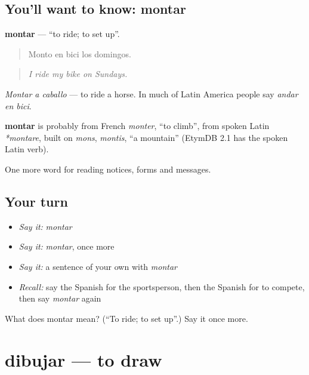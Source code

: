 \subsection*{You'll want to know: montar}
\textbf{montar} — \textquotedblleft{}to ride; to set up\textquotedblright{}.

\begin{quote}
Monto en bici los domingos.
\end{quote}

\begin{quote}
\emph{I ride my bike on Sundays.}
\end{quote}

\emph{Montar a caballo} — to ride a horse. In much of Latin America people say \emph{andar en bici}.

\begin{cousinweb}
\textbf{montar} is probably from French \emph{monter}, \textquotedblleft{}to climb\textquotedblright{}, from spoken Latin \emph{*montare}, built on \emph{mons}, \emph{montis}, \textquotedblleft{}a mountain\textquotedblright{} (EtymDB 2.1 has the spoken Latin verb).
\end{cousinweb}

\begin{grammarlens}[title={What you've built}]
One more word for reading notices, forms and messages.
\end{grammarlens}

\subsection*{Your turn}
\begin{itemize}
\raggedright
  \item \emph{Say it:} \emph{montar}
  \item \emph{Say it:} \emph{montar}, once more
  \item \emph{Say it:} a sentence of your own with \emph{montar}
  \item \emph{Recall:} say the Spanish for the sportsperson, then the Spanish for to compete, then say \emph{montar} again
\end{itemize}

\begin{tcolorbox}[breakable,colback=teal!4,colframe=teal!35!black,title={Before you move on}]
What does montar mean? (\textquotedblleft{}To ride; to set up\textquotedblright{}.) Say it once more.
\end{tcolorbox}
\section[dibujar]{dibujar — to draw}

